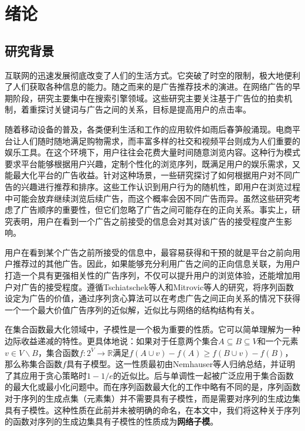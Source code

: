 \chapter{绪论}

\section{研究背景}
互联网的迅速发展彻底改变了人们的生活方式。它突破了时空的限制，极大地便利了人们获取各种信息的能力。随之而来的是广告推荐技术的演进。在网络广告的早期阶段，研究主要集中在搜索引擎领域。这些研究主要关注基于广告位的拍卖机制，着重探讨关键词与广告之间的关系，目标是提高用户的点击率\cite{edelman2007internet,attenberg2009modeling}。

随着移动设备的普及，各类便利生活和工作的应用软件如雨后春笋般涌现。电商平台让人们随时随地满足购物需求，而丰富多样的社交和视频平台则成为人们重要的娱乐工具。在这个环境下，用户往往会花费大量时间随意浏览内容。这种行为模式要求平台能够根据用户兴趣，定制个性化的浏览序列，既满足用户的娱乐需求，又能最大化平台的广告收益。针对这种场景，一些研究\cite{kempe2008cascade,craswell2008experimental,tang2017robust}探讨了如何根据用户对不同广告的兴趣进行推荐和排序。这些工作认识到用户行为的随机性，即用户在浏览过程中可能会放弃继续浏览后续广告，而这个概率会因不同广告而异。虽然这些研究考虑了广告顺序的重要性，但它们忽略了广告之间可能存在的正向关系。事实上，研究表明，用户在看到一个广告之前接受的信息会对其对该广告的接受程度产生影响\cite{loda2005sequence}。

用户在看到某个广告之前所接受的信息中，最容易获得和干预的就是平台之前向用户推荐过的其他广告。因此，如果能够充分利用广告之间的正向信息关联，为用户打造一个具有更强相关性的广告序列，不仅可以提升用户的浏览体验，还能增加用户对广告的接受程度。遵循Tschiatschek等人\cite{tschiatschek2017selecting}和Mitrovic等人\cite{mitrovic2018submodularity}的研究，将序列函数设定为广告的价值，通过序列贪心算法可以在考虑广告之间正向关系的情况下获得一个一个最大价值广告序列的近似解，近似比与网络的结构结构有关。


在集合函数最大化领域中，子模性是一个极为重要的性质。它可以简单理解为一种边际收益递减的特性。更具体地说：如果对于任意两个集合$A\subseteq B \subseteq V$和一个元素$v\in V\backslash B$，集合函数$f: 2^V \to \mathbb{R}$满足$f(A\cup v) - f(A) \ge f(B\cup v) -f(B)$，那么称集合函数$f$具有子模型。这一性质最初由Nemhauser\cite{nemhauser1978analysis}等人归纳总结，并证明了其应用于贪心策略时$1-1/e$的近似比。后与单调性一起被广泛应用于集合函数的最大化或最小化问题中\cite{nemhauser1978best,khuller1999budgeted}。而在序列函数最大化的工作中\cite{tschiatschek2017selecting,mitrovic2018submodularity}略有不同的是，序列函数对于序列的生成点集（元素集）并不需要具有子模性，而是需要对序列的生成边集具有子模性。这种性质在此前并未被明确的命名，在本文中，我们将这种关于序列的函数对序列的生成边集具有子模性的性质成为\textbf{网络子模}。 

